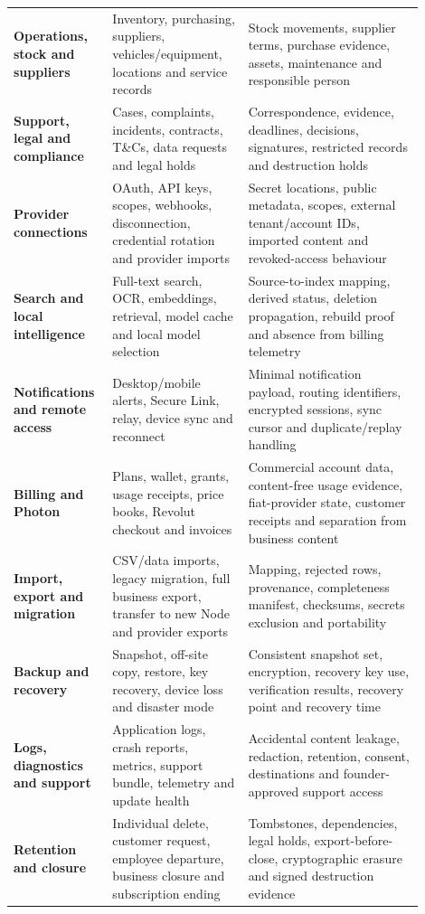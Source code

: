 \documentclass[11pt]{article}
\begin{document}
\begin{longtable}{>{\raggedright\arraybackslash\bfseries}p{0.19\linewidth} p{0.31\linewidth} p{0.40\linewidth}}
Operations, stock and suppliers & Inventory, purchasing, suppliers, vehicles/equipment, locations and service records & Stock movements, supplier terms, purchase evidence, assets, maintenance and responsible person \\
Support, legal and compliance & Cases, complaints, incidents, contracts, T\&Cs, data requests and legal holds & Correspondence, evidence, deadlines, decisions, signatures, restricted records and destruction holds \\
Provider connections & OAuth, API keys, scopes, webhooks, disconnection, credential rotation and provider imports & Secret locations, public metadata, scopes, external tenant/account IDs, imported content and revoked-access behaviour \\
Search and local intelligence & Full-text search, OCR, embeddings, retrieval, model cache and local model selection & Source-to-index mapping, derived status, deletion propagation, rebuild proof and absence from billing telemetry \\
Notifications and remote access & Desktop/mobile alerts, Secure Link, relay, device sync and reconnect & Minimal notification payload, routing identifiers, encrypted sessions, sync cursor and duplicate/replay handling \\
Billing and Photon & Plans, wallet, grants, usage receipts, price books, Revolut checkout and invoices & Commercial account data, content-free usage evidence, fiat-provider state, customer receipts and separation from business content \\
Import, export and migration & CSV/data imports, legacy migration, full business export, transfer to new Node and provider exports & Mapping, rejected rows, provenance, completeness manifest, checksums, secrets exclusion and portability \\
Backup and recovery & Snapshot, off-site copy, restore, key recovery, device loss and disaster mode & Consistent snapshot set, encryption, recovery key use, verification results, recovery point and recovery time \\
Logs, diagnostics and support & Application logs, crash reports, metrics, support bundle, telemetry and update health & Accidental content leakage, redaction, retention, consent, destinations and founder-approved support access \\
Retention and closure & Individual delete, customer request, employee departure, business closure and subscription ending & Tombstones, dependencies, legal holds, export-before-close, cryptographic erasure and signed destruction evidence \\
\bottomrule
\end{longtable}
\end{document}
